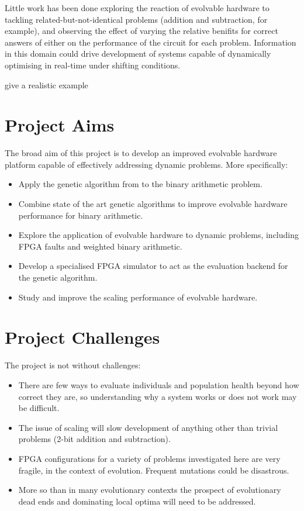Little work has been done exploring the reaction of evolvable hardware to tackling
related-but-not-identical problems (addition and subtraction, for example), and observing
the effect of varying
the relative benifits for correct answers of either on the performance of the circuit for each problem.
Information in this domain could
drive development of systems capable of dynamically optimising in real-time
under shifting conditions.

\todo give a realistic example

\section{Project Aims}

The broad aim of this project is to develop an improved evolvable hardware
platform capable of effectively addressing dynamic problems. More specifically:
\begin{itemize}
	\item Apply the genetic algorithm from \cite{10.1007/3-540-63173-9_61} to
		the binary arithmetic problem.
	\item Combine state of the art genetic algorithms to improve
		evolvable hardware performance for binary arithmetic.
	\item Explore the application of evolvable hardware to dynamic
		problems, including FPGA faults and weighted binary arithmetic.
	\item Develop a specialised FPGA simulator to act as the evaluation
		backend for the genetic algorithm.
	\item Study and improve the scaling performance of evolvable hardware.
\end{itemize}

\section{Project Challenges}
The project is not without challenges:
\begin{itemize}
	\item There are few ways to evaluate individuals and population health beyond how
		correct they are, so understanding why a system works or does not work may
		be difficult.
	\item The issue of scaling will slow development of anything other than
		trivial problems (2-bit addition and subtraction).
	\item FPGA configurations for a variety of problems investigated here are very fragile, in the
		context of evolution. Frequent mutations could be disastrous.
	\item More so than in many evolutionary contexts the prospect of evolutionary dead ends
		and dominating local optima will need to be addressed.
\end{itemize}
